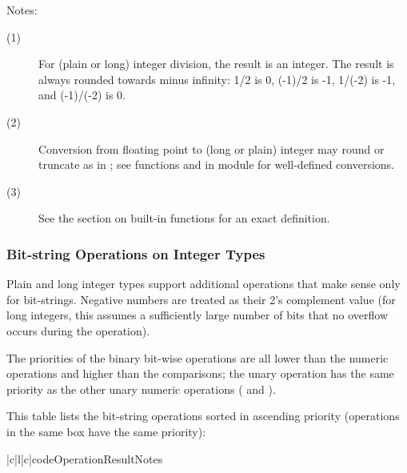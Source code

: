 \noindent
Notes:
\begin{description}

\item[(1)]
For (plain or long) integer division, the result is an integer.
The result is always rounded towards minus infinity: 1/2 is 0, 
(-1)/2 is -1, 1/(-2) is -1, and (-1)/(-2) is 0.

\item[(2)]
Conversion from floating point to (long or plain) integer may round or
truncate as in \C{}; see functions  and  in
module  for well-defined conversions.

\item[(3)]
See the section on built-in functions for an exact definition.

\end{description}

\subsubsection{Bit-string Operations on Integer Types}

Plain and long integer types support additional operations that make
sense only for bit-strings.  Negative numbers are treated as their 2's
complement value (for long integers, this assumes a sufficiently large
number of bits that no overflow occurs during the operation).

The priorities of the binary bit-wise operations are all lower than
the numeric operations and higher than the comparisons; the unary
operation \samp{~} has the same priority as the other unary numeric
operations (\samp{+} and \samp{-}).

This table lists the bit-string operations sorted in ascending
priority (operations in the same box have the same priority):

\begin{tableiii}{|c|l|c|}{code}{Operation}{Result}{Notes}
  \hline
  \hline
  \hline
  \hline
  \hline
\end{tableiii}

